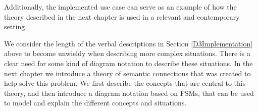 Additionally, the implemented use case can serve as an example of how the theory described in the next chapter is used in a relevant and contemporary setting.

We consider the length of the verbal descriptions in Section \ref{D3Implementation} above to become unwieldy when describing more complex situations. There is a clear need for some kind of diagram notation to describe these situations. In the next chapter we introduce a theory of semantic connections that was created to help solve this problem. We first describe the concepts that are central to this theory, and then introduce a diagram notation based on \acp{FSM}, that can be used to model and explain the different concepts and situations.


